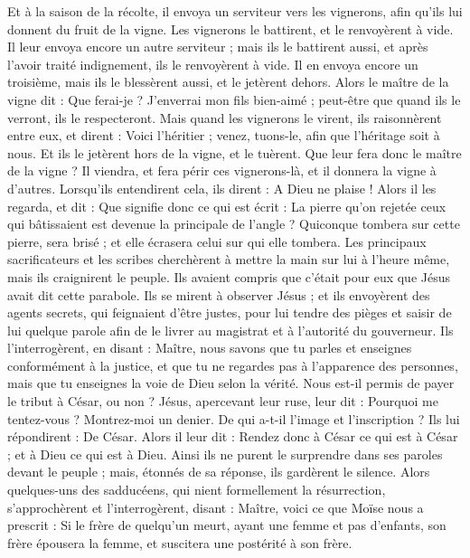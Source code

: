 \begin{multicols}{2}
{Et à la saison de la récolte, il envoya un serviteur vers les vignerons, afin qu'ils lui donnent du fruit de la vigne. Les vignerons le battirent, et le renvoyèrent à vide.
Il leur envoya encore un autre serviteur ; mais ils le battirent aussi, et après l'avoir traité indignement, ils le renvoyèrent à vide.
Il en envoya encore un troisième, mais ils le blessèrent aussi, et le jetèrent dehors.
Alors le maître de la vigne dit : Que ferai-je ? J’enverrai mon fils bien-aimé ; peut-être que quand ils le verront, ils le respecteront.
Mais quand les vignerons le virent, ils raisonnèrent entre eux, et dirent : Voici l'héritier ; venez, tuons-le, afin que l'héritage soit à nous.
Et ils le jetèrent hors de la vigne, et le tuèrent. Que leur fera donc le maître de la vigne ?
Il viendra, et fera périr ces vignerons-là, et il donnera la vigne à d'autres. Lorsqu’ils entendirent cela, ils dirent : A Dieu ne plaise !
Alors il les regarda, et dit : Que signifie donc ce qui est écrit : La pierre qu’on rejetée ceux qui bâtissaient est devenue la principale de l’angle ?
Quiconque tombera sur cette pierre, sera brisé ; et elle écrasera celui sur qui elle tombera.
Les principaux sacrificateurs et les scribes cherchèrent à mettre la main sur lui à l’heure même, mais ils craignirent le peuple. Ils avaient compris que c’était pour eux que Jésus avait dit cette parabole.
Ils se mirent à observer Jésus ; et ils envoyèrent des agents secrets, qui feignaient d’être justes, pour lui tendre des pièges et saisir de lui quelque parole afin de le livrer au magistrat et à l’autorité du gouverneur.
Ils l'interrogèrent, en disant : Maître, nous savons que tu parles et enseignes conformément à la justice, et que tu ne regardes pas à l'apparence des personnes, mais que tu enseignes la voie de Dieu selon la vérité.
Nous est-il permis de payer le tribut à César, ou non ?
Jésus, apercevant leur ruse, leur dit : Pourquoi me tentez-vous ?
Montrez-moi un denier. De qui a-t-il l'image et l'inscription ? Ils lui répondirent : De César.
Alors il leur dit : Rendez donc à César ce qui est à César ; et à Dieu ce qui est à Dieu.
Ainsi ils ne purent le surprendre dans ses paroles devant le peuple ; mais, étonnés de sa réponse, ils gardèrent le silence.
\TextTitle{[La résurrection]}
Alors quelques-uns des sadducéens, qui nient formellement la résurrection, s'approchèrent et l'interrogèrent,
disant : Maître, voici ce que Moïse nous a prescrit : Si le frère de quelqu'un meurt, ayant une femme et pas d’enfants, son frère épousera la femme, et suscitera une postérité à son frère.
}
\end{multicols}
